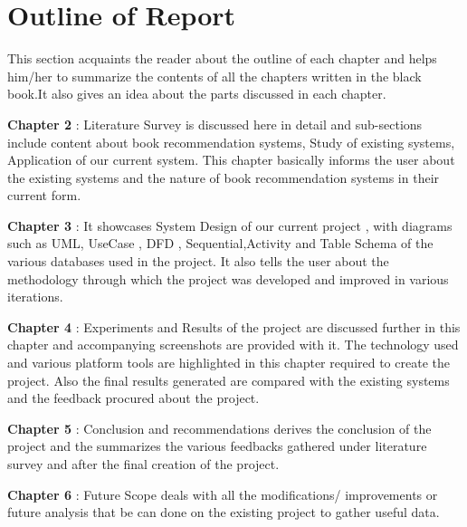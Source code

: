 \documentclass[a4paper,12pt]{report}
\begin{document}
\section{Outline of Report}

\par This section acquaints the reader about the outline of each chapter and helps him/her to summarize the contents of all the chapters written in the black book.It also gives an idea about the parts discussed in each chapter. \\

\par \textbf{Chapter 2} : Literature Survey is discussed here in detail and sub-sections include content about book recommendation systems, Study of existing systems, Application of our current system. This chapter basically informs the user about the existing systems and the nature of book recommendation systems in their current form.\\

\par \textbf{Chapter 3} : It showcases System Design of our current project , with diagrams such as UML, UseCase , DFD , Sequential,Activity and Table Schema of the various databases used in the project. It also tells the user about the methodology through which the project was developed and improved in various iterations. \\

\par \textbf{Chapter 4} : Experiments and Results of the project are discussed further in this chapter and accompanying screenshots are provided with it. The technology used and various platform tools are highlighted in this chapter required to create the project. Also the final results generated are compared with the existing systems and the feedback procured about the project.\\

\par \textbf{Chapter 5} :  Conclusion and recommendations derives the conclusion of the project and the summarizes the various feedbacks gathered under literature survey and after the final creation of the project.\\

\par \textbf{Chapter 6} : Future Scope deals with all the modifications/ improvements or future analysis that be can done on the existing project to gather useful data.\\
\end{document}
